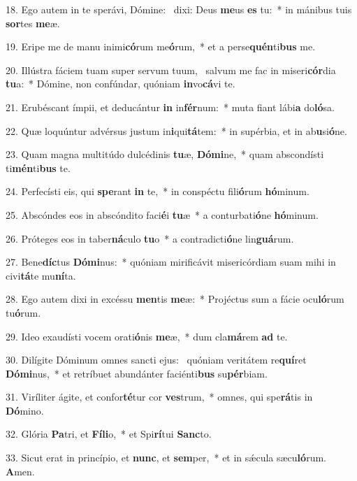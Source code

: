 18. Ego autem in te sperávi, Dómine: \dag\  dixi: Deus \textbf{me}us \textbf{es} tu:~*  in mánibus tuis \textbf{sor}tes \textbf{me}æ.\

19. Eripe me de manu inimi\textbf{có}rum me\textbf{ó}rum,~*  et a perse\textbf{quén}ti\textbf{bus} me.\

20. Illústra fáciem tuam super servum tuum, \dag\  salvum me fac in miseri\textbf{cór}dia \textbf{tu}a:~*  Dómine, non confúndar, quóniam \textbf{in}vo\textbf{cá}vi te.\

21. Erubéscant ímpii, et deducántur \textbf{in} in\textbf{fér}num:~*  muta fiant lábi\textbf{a} do\textbf{ló}sa.\

22. Quæ loquúntur advérsus justum in\textbf{i}qui\textbf{tá}tem:~*  in supérbia, et in ab\textbf{u}si\textbf{ó}ne.\

23. Quam magna multitúdo dulcédinis \textbf{tu}æ, \textbf{Dó}\textbf{mi}ne,~*  quam abscondísti ti\textbf{mén}ti\textbf{bus} te.\

24. Perfecísti eis, qui \textbf{spe}rant \textbf{in} te,~*  in conspéctu fili\textbf{ó}rum \textbf{hó}minum.\

25. Abscóndes eos in abscóndito faci\textbf{é}i \textbf{tu}æ~*  a conturbati\textbf{ó}ne \textbf{hó}minum.\

26. Próteges eos in taber\textbf{ná}culo \textbf{tu}o~*  a contradicti\textbf{ó}ne lin\textbf{guá}rum.\

27. Bene\textbf{díc}tus \textbf{Dó}\textbf{mi}nus:~*  quóniam mirificávit misericórdiam suam mihi in civi\textbf{tá}te mu\textbf{ní}ta.\

28. Ego autem dixi in excéssu \textbf{men}tis \textbf{me}æ:~*  Projéctus sum a fácie ocu\textbf{ló}rum tu\textbf{ó}rum.\

29. Ideo exaudísti vocem orati\textbf{ó}nis \textbf{me}æ,~*  dum cla\textbf{má}rem \textbf{ad} te.\

30. Dilígite Dóminum omnes sancti ejus: \dag\  quóniam veritátem re\textbf{quí}ret \textbf{Dó}\textbf{mi}nus,~*  et retríbuet abundánter faciénti\textbf{bus} su\textbf{pér}biam.\

31. Viríliter ágite, et confor\textbf{té}tur cor \textbf{ves}trum,~*  omnes, qui spe\textbf{rá}tis in \textbf{Dó}mino.\

32. Glória \textbf{Pa}tri, et \textbf{Fí}\textbf{li}o,~*  et Spi\textbf{rí}tui \textbf{Sanc}to.\

33. Sicut erat in princípio, et \textbf{nunc}, et \textbf{sem}per,~*  et in sǽcula sæcu\textbf{ló}rum. \textbf{A}men.\

